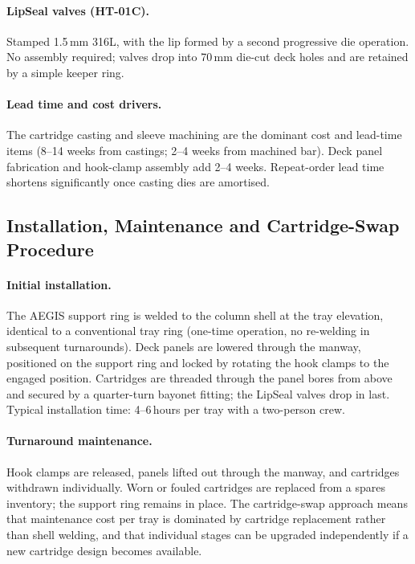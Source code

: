 \documentclass[11pt,letterpaper]{article}
\begin{document}
\paragraph{LipSeal valves (HT-01C).}
Stamped 1.5\,mm 316L, with the lip formed by a second progressive die
operation.  No assembly required; valves drop into 70\,mm die-cut deck
holes and are retained by a simple keeper ring.

\paragraph{Lead time and cost drivers.}
The cartridge casting and sleeve machining are the dominant cost and lead-time
items (8--14 weeks from castings; 2--4 weeks from machined bar).  Deck panel
fabrication and hook-clamp assembly add 2--4 weeks.  Repeat-order lead time
shortens significantly once casting dies are amortised.

\subsection{Installation, Maintenance and Cartridge-Swap Procedure}
\label{sec:installation}

\paragraph{Initial installation.}
The AEGIS support ring is welded to the column shell at the tray elevation,
identical to a conventional tray ring (one-time operation, no re-welding in
subsequent turnarounds).  Deck panels are lowered through the manway,
positioned on the support ring and locked by rotating the hook clamps to the
engaged position.  Cartridges are threaded through the panel bores from above
and secured by a quarter-turn bayonet fitting; the LipSeal valves drop in last.
Typical installation time: 4--6\,hours per tray with a two-person crew.

\paragraph{Turnaround maintenance.}
Hook clamps are released, panels lifted out through the manway, and
cartridges withdrawn individually.  Worn or fouled cartridges are replaced
from a spares inventory; the support ring remains in place.  The
cartridge-swap approach means that maintenance cost per tray is dominated by
cartridge replacement rather than shell welding, and that individual stages
can be upgraded independently if a new cartridge design becomes available.
\end{document}
